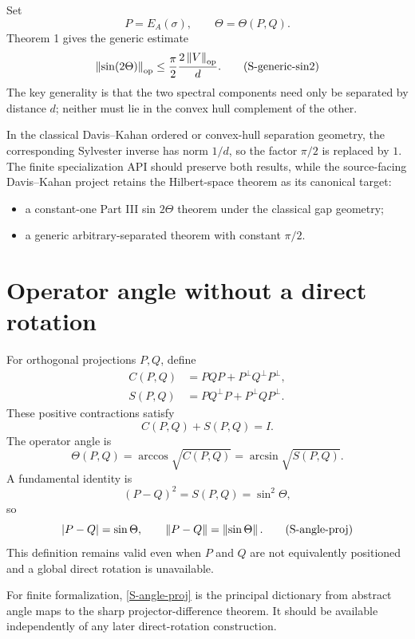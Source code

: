 Set
\[
 P=E_A(\sigma),
 \qquad
 \Theta=\Theta(P,Q).
\]
Theorem 1 gives the generic estimate
\begin{equation}
 \left\lVert \sin(2\Theta)\right\rVert_{\mathrm{op}}
 \le
 \frac{\pi}{2}\frac{2\left\lVert V\right\rVert_{\mathrm{op}}}{d}.
 \tag{S-generic-sin2}
\end{equation}
The key generality is that the two spectral components need only be separated by distance $d$; neither must lie in the convex hull complement of the other.

In the classical Davis--Kahan ordered or convex-hull separation geometry, the corresponding Sylvester inverse has norm $1/d$, so the factor $\pi/2$ is replaced by $1$. The finite specialization API should preserve both results, while the source-facing Davis--Kahan project retains the Hilbert-space theorem as its canonical target:
\begin{itemize}[leftmargin=2em]
\item a constant-one Part III sin $2\Theta$ theorem under the classical gap geometry;
\item a generic arbitrary-separated theorem with constant $\pi/2$.
\end{itemize}

\section{Operator angle without a direct rotation}

For orthogonal projections $P,Q$, define
\begin{align*}
 C(P,Q)&=PQP+P^\perp Q^\perp P^\perp,\\
 S(P,Q)&=PQ^\perp P+P^\perp QP^\perp.
\end{align*}
These positive contractions satisfy
\[
 C(P,Q)+S(P,Q)=I.
\]
The operator angle is
\[
 \Theta(P,Q)
 =\arccos\sqrt{C(P,Q)}
 =\arcsin\sqrt{S(P,Q)}.
\]
A fundamental identity is
\[
 (P-Q)^2=S(P,Q)=\sin^2\Theta,
\]
so
\begin{equation}
 \left\lvert P-Q\right\rvert=\sin\Theta,
 \qquad
 \left\lVert P-Q\right\rVert=\left\lVert \sin\Theta\right\rVert.
 \tag{S-angle-proj}\label{S-angle-proj}
\end{equation}
This definition remains valid even when $P$ and $Q$ are not equivalently positioned and a global direct rotation is unavailable.

For finite formalization, \eqref{S-angle-proj} is the principal dictionary from abstract angle maps to the sharp projector-difference theorem. It should be available independently of any later direct-rotation construction.

